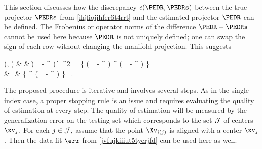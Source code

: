 

\label{SEDRqua}
This section discusses how the discrepancy \( \epsilon(\PEDR , \PEDRs) \) between the true projector \( \PEDRs \) 
from \eqref{ihjfiojihfer6t4rrt} and 
the estimated projector \( \PEDR \) can be defined.
The Frobenius or operator norms of the difference \( \PEDR - \PEDRs \) cannot be used here because
\( \PEDR \) is not uniquely defined; one can swap the sign of each row without changing the manifold projection. 
This suggests
\begin{EQA}[rcl]
	\epsilon(\PEDR , \PEDRs)
	& \eqdef &
	\bigl\| \PEDR (\Id_{\dimd} - {\PEDRs}^{\T} \PEDRs) \bigr\|_{\Fr}^{2}
	=
	\tr \bigl\{ (\Id_{\dimd} - {\PEDRs}^{\T} \PEDRs) \PEDR^{\T} \PEDR (\Id_{\dimd} - {\PEDRs}^{\T} \PEDRs) \bigr\}
	\\
	&=&
	\tr \bigl\{ \PEDR^{\T} \PEDR (\Id_{\dimd} - {\PEDRs}^{\T} \PEDRs) \bigr\}
	\, .
\label{hjjjuuuu55gswwdtgf}
\end{EQA}

The proposed procedure is iterative and involves several steps.
As in the single-index case, 
a proper stopping rule is an issue and requires evaluating the quality of estimation at every step.
%
The quality of estimation will be measured by the generalization error on the testing set
which corresponds to the set \( \mathcal{J} \) of centers \( \xv_{j} \).
%
For each \( j \in \mathcal{J} \), assume that the point \( \Xv_{i(j)} \) is aligned  
with a center \( \xv_{j} \).
Then the data fit \( \err \) from \eqref{jvfujkiiiut5tyerjfd} can be used here as well.

